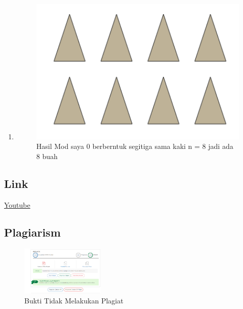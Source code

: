 \begin{enumerate}
    \item 
	
	\begin{figure}[H]
		\includegraphics[width=12cm]{figures/1174008/2/hasilsoal10mod.PNG}
		\centering
		\caption{Hasil Mod saya 0 berberntuk segitiga sama kaki n = 8 jadi ada 8 buah}
	\end{figure}
\end{enumerate}

\subsection{Link}
\href{https://www.youtube.com/watch?v=Nd2ZXhCWFJU&t=6s}{Youtube}

\subsection{Plagiarism}
\begin{figure}[H]
	\includegraphics[width=4cm]{figures/1174008/2/hasilplagiat.PNG}
	\centering
	\caption{Bukti Tidak Melakukan Plagiat}
\end{figure}